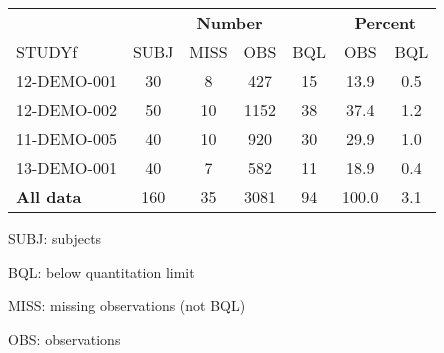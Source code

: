 \setlength{\tabcolsep}{5pt} 
\begin{threeparttable}
\renewcommand{\arraystretch}{1.3}
\begin{tabular}[h]{lcccccc}
\hline
\multicolumn{1}{c}{} & \multicolumn{4}{c}{\textbf{Number}} & \multicolumn{2}{c}{\textbf{Percent}}\\
\cmidrule(lr){2-5}
\cmidrule(lr){6-7}
STUDYf & SUBJ & MISS & OBS & BQL & OBS & BQL \\
\hline
12-DEMO-001 & 30 & 8 & 427 & 15 & 13.9 & 0.5 \\
12-DEMO-002 & 50 & 10 & 1152 & 38 & 37.4 & 1.2 \\
11-DEMO-005 & 40 & 10 & 920 & 30 & 29.9 & 1.0 \\
13-DEMO-001 & 40 & 7 & 582 & 11 & 18.9 & 0.4 \\
\hline \hline {\bf All data} & 160 & 35 & 3081 & 94 & 100.0 & 3.1 \\
\hline
\end{tabular}
\begin{tablenotes}[flushleft]
\item SUBJ: subjects
\item BQL: below quantitation limit
\item MISS: missing observations (not BQL)
\item OBS: observations
\end{tablenotes}
\end{threeparttable}

